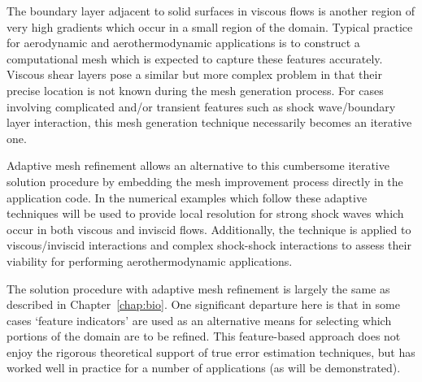The boundary layer adjacent to solid surfaces in viscous flows is another region of very high gradients which occur in a small region of the domain.  Typical practice for aerodynamic and aerothermodynamic applications is to construct a computational mesh which is expected to capture these features accurately. Viscous shear layers pose a similar but more complex problem in that their precise location is not known during the mesh generation process. For cases involving complicated and/or transient features such as shock wave/boundary layer interaction, this mesh generation technique necessarily becomes an iterative one.

Adaptive mesh refinement allows an alternative to this cumbersome iterative solution procedure by embedding the mesh improvement process directly in the application code.  In the numerical examples which follow these adaptive techniques will be used to provide local resolution for strong shock waves which occur in both viscous and inviscid flows.  Additionally, the technique is applied to viscous/inviscid interactions and complex shock-shock interactions to assess their viability for performing aerothermodynamic applications.

The solution procedure with adaptive mesh refinement is largely the same as described in Chapter~\ref{chap:bio}.  One significant departure here is that in some cases `feature indicators' are used as an alternative means for selecting which portions of the domain are to be refined.  This feature-based approach does not enjoy the rigorous theoretical support of true error estimation techniques, but has worked well in practice for a number of applications (as will be demonstrated).


